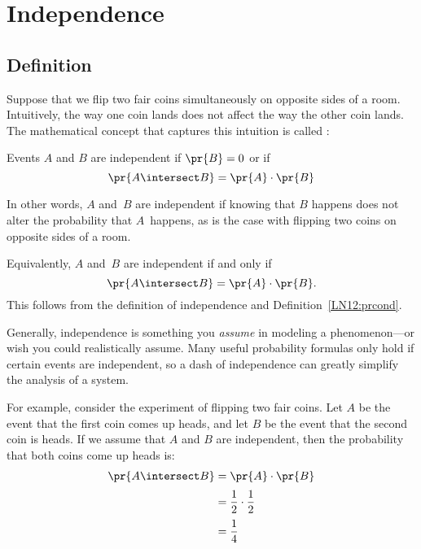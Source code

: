\chapter{Independence}

\section{Definition}

Suppose that we flip two fair coins simultaneously on opposite sides
of a room.  Intuitively, the way one coin lands does not affect the
way the other coin lands.  The mathematical concept that captures
this intuition is called :
\begin{definition}\label{def:independence}
Events $A$ and $B$ are independent if $\pr{B} = 0$ or if
\begin{equation}\label{eqn:independence}
    \pr{A \intersect B} = \pr{A} \cdot \pr{B}
\end{equation}
\end{definition}
In other words, $A$ and~$B$ are independent if knowing that $B$
happens does not alter the probability that $A$~happens, as is the
case with flipping two coins on opposite sides of a room.

Equivalently, $A$ and~$B$ are independent if and only if
\begin{equation}\label{eqn:15D3}
    \pr{A \intersect B} = \pr{A} \cdot \pr{B}.
\end{equation}
This follows from the definition of independence and
Definition~\ref{LN12:prcond}.  

Generally, independence is something you \emph{assume} in modeling a
phenomenon---or wish you could realistically assume.  Many useful
probability formulas only hold if certain events are independent, so a
dash of independence can greatly simplify the analysis of a system.

For example, consider the experiment of flipping two fair coins.  Let
$A$ be the event that the first coin comes up heads, and let $B$ be
the event that the second coin is heads.  If we assume that $A$ and
$B$ are independent, then the probability that both coins come up
heads is:
%
\begin{align*}
\pr{A \intersect B} & = \pr{A} \cdot \pr{B} \\[2pt]
              & = \frac{1}{2} \cdot \frac{1}{2} \\[2pt]
              & = \frac{1}{4}
\end{align*}

